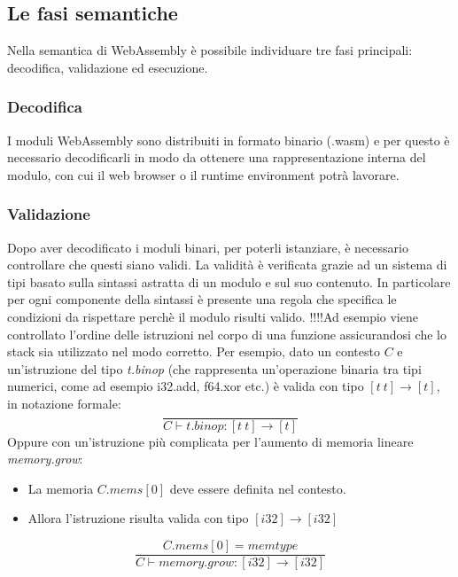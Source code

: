 \newpage
\subsection{Le fasi semantiche}
Nella semantica di WebAssembly è possibile individuare tre fasi principali: decodifica, validazione ed esecuzione.\cite*{wasmSpec}
\subsubsection{Decodifica}
I moduli WebAssembly sono distribuiti in formato binario (.wasm) e per questo è necessario decodificarli in modo da ottenere una rappresentazione interna del modulo, con cui il web browser o il runtime environment potrà lavorare.
\subsubsection{Validazione}
Dopo aver decodificato i moduli binari, per poterli istanziare, è necessario controllare che questi siano validi.
La validità è verificata grazie ad un sistema di tipi basato sulla sintassi astratta di un modulo e sul suo contenuto. In particolare per ogni componente della sintassi è presente una regola che specifica le condizioni da rispettare perchè il modulo risulti valido.
!!!!Ad esempio viene controllato l'ordine delle istruzioni nel corpo di una funzione assicurandosi che lo stack sia utilizzato nel modo corretto.
Per esempio, dato un contesto \(C\) e un'istruzione del tipo \emph{t.binop} (che rappresenta un'operazione binaria tra tipi numerici, come ad esempio i32.add, f64.xor etc.) è valida con tipo \([t~t]{\rightarrow} [t]\), in notazione formale: 
\begin{equation*}
\frac{
}{
        C {\vdash} t\mathsf{.}{\mathit{binop}} : [t~t] {\rightarrow} [t]
}
\end{equation*}
Oppure con un'istruzione più complicata per l'aumento di memoria lineare \emph{memory.grow}:
\begin{itemize}
        \item La memoria \(C.{\mathit{mems}}[0]\) deve essere definita nel contesto.
        \item Allora l'istruzione risulta valida con tipo \([{\mathit{i32}}] {\rightarrow} [{\mathit{i32}}]\)
\end{itemize}
\begin{equation*}
        \frac{
        C.{\mathit{mems}}[0] = {\mathit{memtype}}
      }{
        C {\vdash} {\mathit{memory.grow}} : [{\mathit{i32}}] {\rightarrow} [{\mathit{i32}}]
      }        
\end{equation*}
